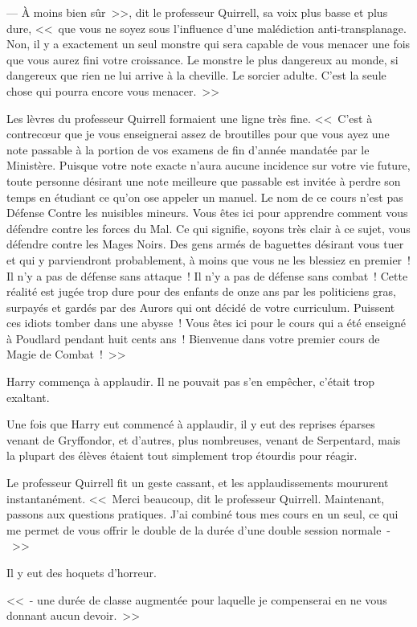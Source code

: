 --- À moins bien sûr~>>, dit le professeur Quirrell, sa voix plus basse et plus dure, <<~que vous ne soyez sous l'influence d'une malédiction anti-transplanage. Non, il y a exactement un seul monstre qui sera capable de vous menacer une fois que vous aurez fini votre croissance. Le monstre le plus dangereux au monde, si dangereux que rien ne lui arrive à la cheville. Le sorcier adulte. C'est la seule chose qui pourra encore vous menacer.~>>

Les lèvres du professeur Quirrell formaient une ligne très fine. <<~C'est à contrecœur que je vous enseignerai assez de broutilles pour que vous ayez une note passable à la portion de vos examens de fin d'année mandatée par le Ministère. Puisque votre note exacte n'aura aucune incidence sur votre vie future, toute personne désirant une note meilleure que passable est invitée à perdre son temps en étudiant ce qu'on ose appeler un manuel. Le nom de ce cours n'est pas Défense Contre les nuisibles mineurs. Vous êtes ici pour apprendre comment vous défendre contre les forces du Mal. Ce qui signifie, soyons très clair à ce sujet, vous défendre contre les Mages Noirs. Des gens armés de baguettes désirant vous tuer et qui y parviendront probablement, à moins que vous ne les blessiez en premier~! Il n'y a pas de défense sans attaque~! Il n'y a pas de défense sans combat~! Cette réalité est jugée trop dure pour des enfants de onze ans par les politiciens gras, surpayés et gardés par des Aurors qui ont décidé de votre curriculum. Puissent ces idiots tomber dans une abysse~! Vous êtes ici pour le cours qui a été enseigné à Poudlard pendant huit cents ans~! Bienvenue dans votre premier cours de Magie de Combat~!~>>

Harry commença à applaudir. Il ne pouvait pas s'en empêcher, c'était trop exaltant.

Une fois que Harry eut commencé à applaudir, il y eut des reprises éparses venant de Gryffondor, et d'autres, plus nombreuses, venant de Serpentard, mais la plupart des élèves étaient tout simplement trop étourdis pour réagir.

Le professeur Quirrell fit un geste cassant, et les applaudissements moururent instantanément. <<~Merci beaucoup, dit le professeur Quirrell. Maintenant, passons aux questions pratiques. J'ai combiné tous mes cours en un seul, ce qui me permet de vous offrir le double de la durée d'une double session normale~-~>>

Il y eut des hoquets d'horreur.

<<~- une durée de classe augmentée pour laquelle je compenserai en ne vous donnant aucun devoir.~>>

